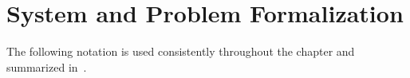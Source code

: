


\section{System and Problem Formalization}
\label{sec:selforgfl-formalization}

The following notation is used consistently throughout the chapter
 and summarized in~.

